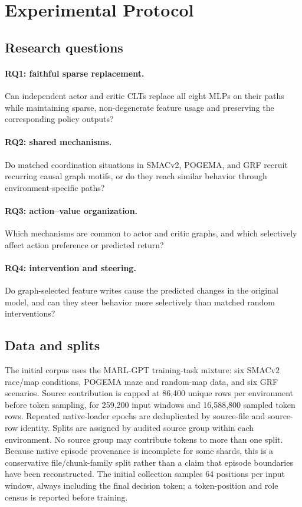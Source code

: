 \section{Experimental Protocol}

\subsection{Research questions}

\paragraph{RQ1: faithful sparse replacement.} Can independent actor and critic CLTs replace all eight MLPs on their paths while maintaining sparse, non-degenerate feature usage and preserving the corresponding policy outputs?

\paragraph{RQ2: shared mechanisms.} Do matched coordination situations in SMACv2, POGEMA, and GRF recruit recurring causal graph motifs, or do they reach similar behavior through environment-specific paths?

\paragraph{RQ3: action--value organization.} Which mechanisms are common to actor and critic graphs, and which selectively affect action preference or predicted return?

\paragraph{RQ4: intervention and steering.} Do graph-selected feature writes cause the predicted changes in the original model, and can they steer behavior more selectively than matched random interventions?

\subsection{Data and splits}

The initial corpus uses the MARL-GPT training-task mixture: six SMACv2 race/map conditions, POGEMA maze and random-map data, and six GRF scenarios. Source contribution is capped at 86,400 unique rows per environment before token sampling, for 259,200 input windows and 16,588,800 sampled token rows. Repeated native-loader epochs are deduplicated by source-file and source-row identity. Splits are assigned by audited source group within each environment. No source group may contribute tokens to more than one split. Because native episode provenance is incomplete for some shards, this is a conservative file/chunk-family split rather than a claim that episode boundaries have been reconstructed. The initial collection samples 64 positions per input window, always including the final decision token; a token-position and role census is reported before training.


